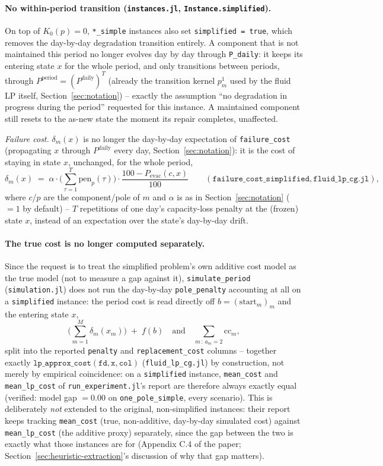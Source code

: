 \documentclass[11pt]{article}
\begin{document}
\paragraph{No within-period transition (\texttt{instances.jl}, \texttt{Instance.simplified}).}
On top of $K_0(p) = 0$, \texttt{*\_simple} instances also set \texttt{simplified = true},
which removes the day-by-day degradation transition entirely. A component that is not
maintained this period no longer evolves day by day through \texttt{P\_daily}: it keeps
its entering state $x$ for the whole period, and only transitions between periods, through
$P^{\mathrm{period}} = (P^{\mathrm{daily}})^{T}$ (already the transition kernel $p^1_m$ used
by the fluid LP itself, Section~\ref{sec:notation}) -- exactly the assumption ``no
degradation in progress during the period'' requested for this instance. A maintained
component still resets to the as-new state the moment its repair completes, unaffected.

\emph{Failure cost.} $\delta_m(x)$ is no longer the day-by-day
expectation of \texttt{failure\_cost} (propagating $x$ through $P^{\mathrm{daily}}$ every
day, Section~\ref{sec:notation}): it is the cost of staying in state $x$, unchanged, for
the whole period,
\[
  \delta_m(x) \;=\; \alpha \cdot \Big(\sum_{\tau=1}^{T} \mathrm{pen}_p(\tau)\Big) \cdot \frac{100 - P_{\mathrm{evac}}(c,x)}{100}
  \qquad (\texttt{failure\_cost\_simplified}, \texttt{fluid\_lp\_cg.jl}),
\]
where $c$/$p$ are the component/pole of $m$ and $\alpha$ is as in Section~\ref{sec:notation}
($=1$ by default) -- $T$ repetitions of one day's capacity-loss penalty at the (frozen)
state $x$, instead of an expectation over the state's day-by-day drift.

\paragraph{The true cost is no longer computed separately.} Since the request is to treat
the simplified problem's own additive cost model as the true model (not to measure a gap
against it), \texttt{simulate\_period} (\texttt{simulation.jl}) does not run the day-by-day
\texttt{pole\_penalty} accounting at all on a \texttt{simplified} instance: the period cost
is read directly off $b = (\mathrm{start}_m)_m$ and the entering state $x$,
\[
  \Big(\sum_{m=1}^{M} \delta_m(x_m)\Big) \;+\; f(b) \quad\text{and}\quad \sum_{m\,:\,a_m = 2} \mathrm{cc}_m,
\]
split into the reported \texttt{penalty} and \texttt{replacement\_cost} columns -- together
exactly $\mathtt{lp\_approx\_cost(fd, x, col)}$ (\texttt{fluid\_lp\_cg.jl}) by construction,
not merely by empirical coincidence: on a \texttt{simplified} instance, \texttt{mean\_cost}
and \texttt{mean\_lp\_cost} of \texttt{run\_experiment.jl}'s report are therefore always
exactly equal (verified: model gap $= 0.00$ on \texttt{one\_pole\_simple}, every scenario).
This is deliberately \emph{not} extended to the original, non-simplified instances: their
report keeps tracking \texttt{mean\_cost} (true, non-additive, day-by-day simulated cost)
against \texttt{mean\_lp\_cost} (the additive proxy) separately, since the gap between the
two is exactly what those instances are for (Appendix C.4 of the paper;
Section~\ref{sec:heuristic-extraction}'s discussion of why that gap matters).
\end{document}
